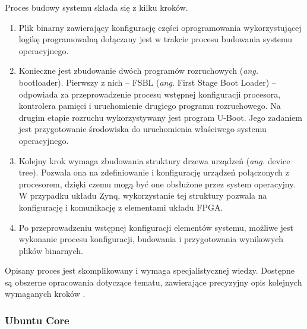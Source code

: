 Proces budowy systemu składa się z kilku kroków. 
\begin{enumerate}
\item Plik binarny zawierający konfigurację części oprogramowania wykorzystującej logikę programowalną dołączany jest w trakcie procesu budowania systemu operacyjnego.%

\item Konieczne jest zbudowanie dwóch programów rozruchowych (\emph{ang.} bootloader). %
Pierwszy z nich -- FSBL (\emph{ang.} First Stage Boot Loader) -- odpowiada za przeprowadzenie procesu wstępnej konfiguracji procesora, kontrolera pamięci i uruchomienie drugiego programu rozruchowego. 
Na drugim etapie rozruchu wykorzystywany jest program U-Boot. 
Jego zadaniem jest przygotowanie środowiska do uruchomienia właściwego systemu operacyjnego.

\item Kolejny krok wymaga zbudowania struktury drzewa urządzeń (\emph{ang.} device tree). 
Pozwala ona na zdefiniowanie i konfigurację urządzeń połączonych z procesorem, dzięki czemu mogą być one obsłużone przez system operacyjny. 
W przypadku układu Zynq, wykorzystanie tej struktury pozwala na konfigurację i komunikację z elementami układu FPGA. %

\item Po przeprowadzeniu wstępnej konfiguracji elementów systemu, możliwe jest wykonanie procesu konfiguracji, budowania i przygotowania wynikowych plików binarnych.
\end{enumerate}
Opisany proces jest skomplikowany i wymaga specjalistycznej wiedzy. 
Dostępne są obszerne opracowania dotyczące tematu, zawierające precyzyjny opis kolejnych wymaganych kroków \cite{zybo-zynq-getting-started,zybo-stock-linux,xilinx-build-kernel}.


\subsubsection{Ubuntu Core}

